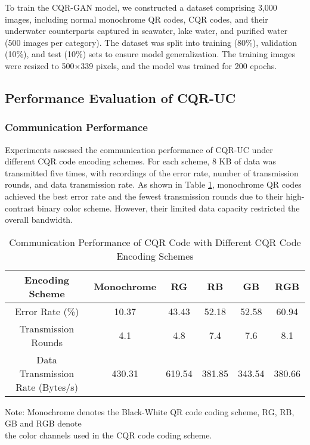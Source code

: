 \documentclass[preprint,12pt]{elsarticle}
\begin{document}
To train the CQR-GAN model, we constructed a dataset comprising 3,000 images, including normal monochrome QR codes, CQR codes, and their underwater counterparts captured in seawater, lake water, and purified water (500 images per category). The dataset was split into training (80\%), validation (10\%), and test (10\%) sets to ensure model generalization. The training images were resized to 500$\times$339 pixels, and the model was trained for 200 epochs.

\subsection{Performance Evaluation of CQR-UC}
\subsubsection{Communication Performance}

Experiments assessed the communication performance of CQR-UC under different CQR code encoding schemes. For each scheme, 8 KB of data was transmitted five times, with recordings of the error rate, number of transmission rounds, and data transmission rate. As shown in Table \ref{tab:qrcode_performance}, monochrome QR codes achieved the best error rate and the fewest transmission rounds due to their high-contrast binary color scheme. However, their limited data capacity restricted the overall bandwidth.

\begin{table}[h]
\centering
\caption{Communication Performance of CQR Code with Different CQR Code Encoding Schemes}
\begin{tabular}{c c c c c c}
\hline
Encoding Scheme & Monochrome         & RG         & RB         & GB         & RGB        \\ \hline
Error Rate (\%)      & 10.37      & 43.43      & 52.18      & 52.58      & 60.94      \\ 
Transmission Rounds          & 4.1          & 4.8          & 7.4          & 7.6          & 8.1          \\ 
Data Transmission Rate (Bytes/s) & 430.31     & 619.54     & 381.85     & 343.54     & 380.66     \\ \hline
\end{tabular}
\label{tab:qrcode_performance}

\footnotesize
Note: Monochrome denotes the Black-White QR code coding scheme, RG, RB, GB and RGB denote \\the color channels used in the CQR code coding scheme.

\end{table}
\end{document}
